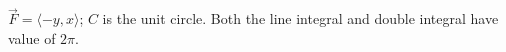 {$\vec F = \langle -y,x\rangle$; $C$ is the unit circle.
}
{Both the line integral and double integral have value of $2\pi$.
}

